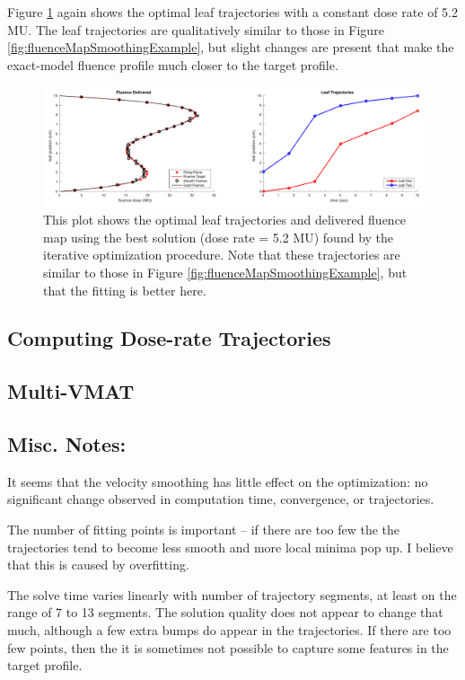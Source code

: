 Figure \ref{fig:fluenceMapIterativeBest} again shows the optimal leaf trajectories with a
constant dose rate of 5.2 MU. The leaf trajectories are qualitatively similar to those in
Figure \ref{fig:fluenceMapSmoothingExample}, but slight changes are present that make the
exact-model fluence profile much closer to the target profile.

\begin{figure}
  \centering
  \includegraphics[width=\textwidth]{fig/fluenceMapIterativeBest.pdf}
  \caption{This plot shows the optimal leaf trajectories and delivered fluence map using the
           best solution (dose rate = 5.2 MU) found by the iterative optimization procedure.
           Note that these trajectories are similar to those in
           Figure \ref{fig:fluenceMapSmoothingExample}, but that the fitting is better here.}
  \label{fig:fluenceMapIterativeBest}
\end{figure}


\subsection{Computing Dose-rate Trajectories}


\subsection{Multi-VMAT}


\subsection{Misc. Notes:}


It seems that the velocity smoothing has little effect on the optimization: no significant
change observed in computation time, convergence, or trajectories.

The number of fitting points is important -- if there are too few the the trajectories tend to
become less smooth and more local minima pop up. I believe that this is caused by overfitting.

The solve time varies linearly with number of trajectory segments, at least on the range of 7 to 13 segments.
The solution quality does not appear to change that much, although a few extra bumps do appear in the trajectories.
If there are too few points, then the it is sometimes not possible to capture some features in the target profile.
